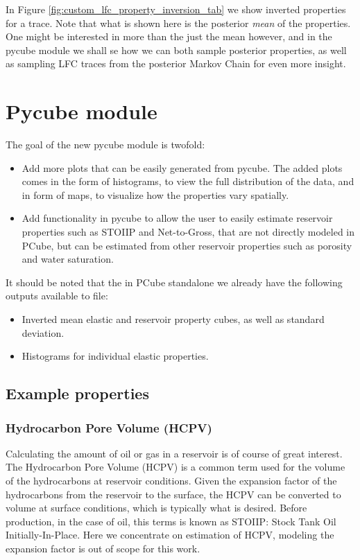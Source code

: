 \documentclass[note,screen,english,12pt,utf8]{nrdoc}
\begin{document}
In Figure \ref{fig:custom_lfc_property_inversion_tab} we show inverted properties
for a trace. Note that what is shown here is the posterior \textit{mean} of the
properties. One might be interested in more than the just the mean however, and
in the pycube module we shall se how we can both sample posterior properties,
as well as sampling LFC traces from the posterior Markov Chain for even more insight.

\section{Pycube module}

The goal of the new pycube module is twofold:
\begin{itemize}
    \item {
        Add more plots that can be easily generated from pycube.
        The added plots comes in the form of histograms, to view the
        full distribution of the data, and in form of maps, to visualize
        how the properties vary spatially.
    }
    \item{
        Add functionality in pycube to allow the user to easily estimate
        reservoir properties such as STOIIP and Net-to-Gross, that are not
        directly modeled in PCube, but can be estimated from
        other reservoir properties such as porosity and water saturation.
    }

\end{itemize}


It should be noted that the in PCube standalone we already have
the following outputs available to file:

\begin{itemize}
    \item Inverted mean elastic and reservoir property cubes, as well as standard deviation.
    \item Histograms for individual elastic properties.
\end{itemize}

\subsection{Example properties}


\subsubsection{Hydrocarbon Pore Volume (HCPV)}

Calculating the amount of oil or gas in a reservoir is of course of great interest.
The Hydrocarbon Pore Volume (HCPV) is a common term used for the volume of the
hydrocarbons at reservoir conditions. Given the expansion factor of the hydrocarbons from the
reservoir to the surface, the HCPV can be converted to volume at surface
conditions, which is typically what is desired. Before production, in the
case of oil, this terms is known as STOIIP: Stock Tank Oil Initially-In-Place.
Here we concentrate on estimation of HCPV, modeling the expansion factor is out
of scope for this work.
\end{document}
